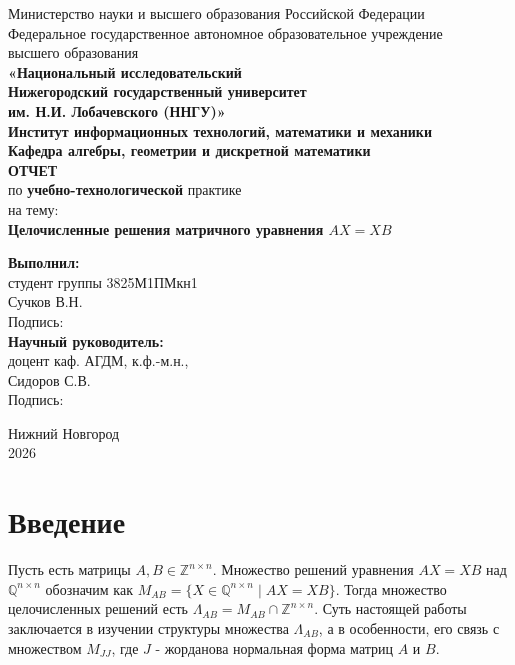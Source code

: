 \documentclass[11pt, a4paper]{article}
\def\intmat#1#2{\mathbb{Z}^{#1 \times #2}}
\def\ratmat#1#2{\mathbb{Q}^{#1 \times #2}}
\def\newsection#1{
    \newpage
    \section*{#1}
    \addcontentsline{toc}{section}{#1}
}
\begin{document}
\begin{center}
Министерство науки и высшего образования Российской Федерации \\
Федеральное государственное автономное образовательное учреждение \\
высшего образования\\ 
\textbf{«Национальный исследовательский \\ Нижегородский государственный университет \\
им. Н.И. Лобачевского (ННГУ)»}\\[1.5cm]
\textbf{Институт информационных технологий, математики и механики\\
Кафедра алгебры, геометрии и дискретной математики}\\[5.5cm]

\textbf{\large ОТЧЕТ} \\
по \textbf{учебно-технологической} практике \\[0.6cm]

на тему:\\
\textbf{\large Целочисленные решения матричного уравнения $AX = XB$}\\[3.7cm]

\begin{flushright}
\begin{minipage}{0.52\textwidth}
\begin{flushleft}
\textbf{Выполнил:} \\
студент группы 3825М1ПМкн1 \\
Сучков В.Н.\\[0.3cm]
Подпись:\\[0.3cm]
\textbf{Научный руководитель:}\\
доцент каф. АГДМ, к.ф.-м.н.,\\  Сидоров С.В.\\[0.3cm]
Подпись:\\[0.3cm]
\end{flushleft}
\end{minipage}
\end{flushright}

\vfill

Нижний Новгород \\
2026

\thispagestyle{empty}
\end{center}

\newpage
\tableofcontents
\thispagestyle{empty}
\newsection{Введение}
\setcounter{page}{1}

Пусть есть матрицы $A, B \in \intmat{n}{n}$. Множество решений уравнения $AX = XB$ над $\ratmat{n}{n}$ 
обозначим как $M_{AB} = \{X\in \ratmat{n}{n}\;|\;  AX = XB \}$. Тогда множество целочисленных решений есть $\Lambda_{AB} = M_{AB} \cap \intmat{n}{n}$.
Суть настоящей работы заключается в изучении структуры множества $\Lambda_{AB}$, а в особенности, его связь с множеством $M_{JJ}$, где 
$J$ - жорданова нормальная форма матриц $A$ и $B$.
\end{document}
